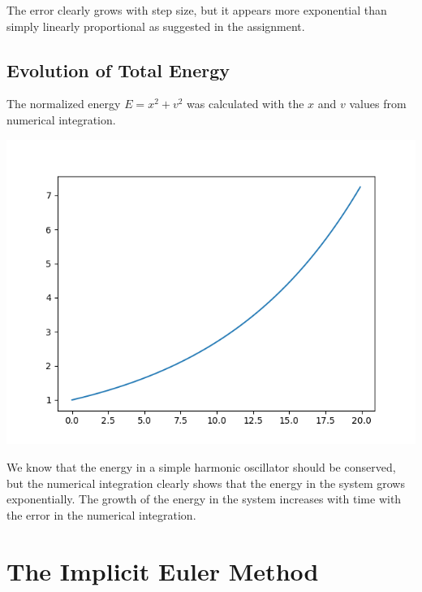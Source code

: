 \documentclass{article}
\begin{document}
The error clearly grows with step size, but it appears more exponential than simply linearly proportional as suggested in the assignment.

\subsection{Evolution of Total Energy}
The normalized energy $E = x^2 + v^2 $ was calculated with the $x$ and $v$ values from numerical integration.

\includegraphics[scale=0.9]{images/explicit_energy.png}

We know that the energy in a simple harmonic oscillator should be conserved, but the numerical integration clearly shows that the energy in the system grows exponentially. The growth of the energy in the system increases with time with the error in the numerical integration.

\section{The Implicit Euler Method}
\end{document}
